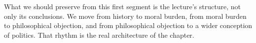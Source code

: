 What we should preserve from this first segment is the lecture's structure, not only its conclusions. We move from history to moral burden, from moral burden to philosophical objection, and from philosophical objection to a wider conception of politics. That rhythm is the real architecture of the chapter.